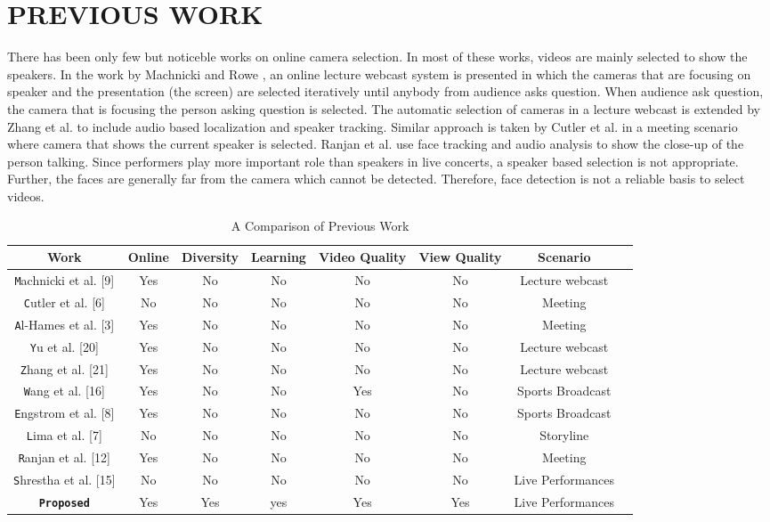 \documentclass{sig-alternate}
\begin{document}
\section{PREVIOUS WORK}
There has been only few but noticeble works on online camera selection. In most of these works, videos are mainly selected to show the speakers. In the work by Machnicki and Rowe \cite{9}, an online lecture webcast system is presented in which the cameras that are focusing on speaker and the presentation (the screen) are selected iteratively until anybody from audience asks question. When audience ask question, the camera that is focusing the person asking question is selected. The automatic selection of cameras in a lecture webcast is extended by Zhang et al. \cite{21} to include audio based localization and speaker tracking. Similar approach is taken by Cutler et al. \cite{6} in a meeting scenario where camera that shows the current speaker is selected. Ranjan et al. \cite{12} use face tracking and audio analysis to show the close-up of the person talking. Since performers play more important role than speakers in live concerts, a speaker based selection is not appropriate. Further, the faces are generally far from the camera which cannot be detected. Therefore, face detection is not a reliable basis to select videos.

\begin{table}
\centering
\caption{A Comparison of Previous Work}
\begin{tabular}{|c|c|c|c|c|c|c|c|} \hline
Work&Online&Diversity&Learning&Video Quality&View Quality&Scenario\\ \hline
\texttt Machnicki et al. [9]&Yes&No&No&No&No&Lecture webcast  \\ \hline 
\texttt Cutler et al. [6]&No&No&No&No&No&Meeting  \\ \hline 
\texttt Al-Hames et al. [3]&Yes&No&No&No&No&Meeting  \\ \hline 
\texttt Yu et al. [20]&Yes&No&No&No&No&Lecture webcast  \\ \hline 
\texttt Zhang et al. [21]&Yes&No&No&No&No&Lecture webcast  \\ \hline 
\texttt Wang et al. [16]&Yes&No&No&Yes&No&Sports Broadcast  \\ \hline 
\texttt Engstrom et al. [8]&Yes&No&No&No&No&Sports Broadcast  \\ \hline 
\texttt Lima et al. [7]&No&No&No&No&No&Storyline  \\ \hline 
\texttt Ranjan et al. [12]&Yes&No&No&No&No&Meeting  \\ \hline 
\texttt Shrestha et al. [15]&No&No&No&No&No&Live Performances  \\ \hline 
\texttt \textbf{Proposed}&Yes&Yes&yes&Yes&Yes&Live Performances\\ \hline
\end{tabular}
\end{table}
\end{document}
